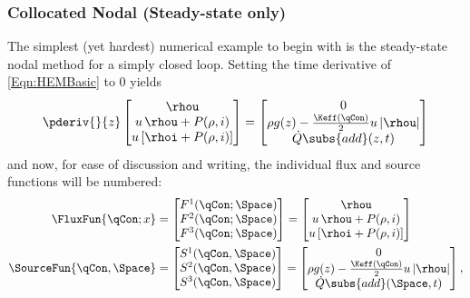 \subsubsection{Collocated Nodal (Steady-state only)}\label{Subsubsection:CollocatedNodal}
The simplest (yet hardest) numerical example to begin with is the steady-state nodal method for a simply closed loop.
Setting the time derivative of \cref{Eqn:HEMBasic} to $0$ yields 
\begin{equation}
    \pderiv{}{z}\begin{bmatrix}
                    \rhou                 \\
                    u\,\rhou + P(\rho,i)   \\
                    u\left[\rhoi  + P(\rho,i)\right]
                \end{bmatrix}
             =  
    \begin{bmatrix}
        0 \\%
        \rho{g(z)} - \frac{\Keff(\qCon)}{2} u\,|\rhou|  \\
        \dot{Q}\subs{add}(z,t)
    \end{bmatrix}
    \label{Eqn:HEMBasicSS}
\end{equation}
and now, for ease of discussion and writing, the individual flux and source functions will be numbered:
\begin{align}
    \FluxFun{\qCon;x} &=    
                \begin{bmatrix}
                    F^1(\qCon;\Space)\\
                    F^2(\qCon;\Space)\\
                    F^3(\qCon;\Space)\\
                \end{bmatrix}
           =    \begin{bmatrix}
                    \rhou                 \\
                    u\,\rhou + P(\rho,i)   \\
                    u\left[\rhoi  + P(\rho,i)\right]
                \end{bmatrix} \\
    \SourceFun{\qCon,\Space} &=  
            \begin{bmatrix}
                    S^1(\qCon,\Space)\\
                    S^2(\qCon,\Space)\\
                    S^3(\qCon,\Space)\\
                \end{bmatrix}
             =  \begin{bmatrix}
                    0 \\%
                    \rho{g(z)} - \frac{\Keff(\qCon)}{2} u\,|\rhou|  \\
                    \dot{Q}\subs{add}(\Space,t)
                \end{bmatrix},
\end{align}

